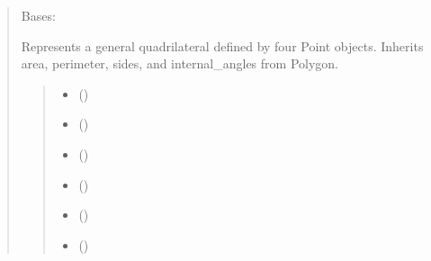 \documentclass[letterpaper,10pt,english]{sphinxmanual}
\begin{document}
\begin{quote}
\begin{fulllineitems}
\label{\detokenize{pygeox:pygeox.custom_objects.Quadrilateral}}
\pysigstartsignatures
\pysiglinewithargsret
{}
{\sphinxparamcomma {}\sphinxparamcomma {}\sphinxparamcomma {}\sphinxparamcomma {}\sphinxparamcomma {}\sphinxparamcomma {}\sphinxparamcomma {}}
{}
\pysigstopsignatures
\sphinxAtStartPar
Bases: 

\sphinxAtStartPar
Represents a general quadrilateral defined by four Point objects.
Inherits area, perimeter, sides, and internal\_angles from Polygon.
\begin{quote}\begin{description}
\begin{itemize}
\item {} 
\sphinxAtStartPar
{} ()

\item {} 
\sphinxAtStartPar
{} ()

\item {} 
\sphinxAtStartPar
{} ()

\item {} 
\sphinxAtStartPar
{} ()

\item {} 
\sphinxAtStartPar
{} (\sphinxstyleliteralemphasis{\sphinxupquote{ | }})

\item {} 
\sphinxAtStartPar
{} (\sphinxstyleliteralemphasis{\sphinxupquote{ | }})


\end{itemize}
\end{description}
\end{quote}
\end{fulllineitems}
\end{quote}
\end{document}
